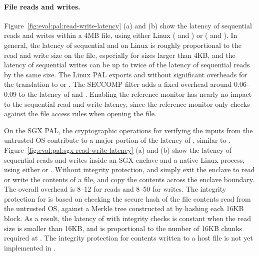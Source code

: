 \paragraph{File reads and writes.}
Figure~\ref{fig:eval:pal:read-write-latency} (a) and (b) show the latency of sequential reads and writes within a 4MB file, using either Linux \linuxapis{} ( and )
or \hostapis{} ( and ).
In general, the latency of sequential  and 
\linuxapis{} on Linux
is roughly proportional to the read and write size on the file,
especially for sizes larger than 4KB, and the latency of sequential writes can be up to twice of the latency of sequential reads by the same size. 
The Linux PAL exports  and 
without significant overheads
for the translation to  or  \linuxapis{}.
The SECCOMP filter adds a fixed overhead around 0.06--0.09 \msec{} to the latency of  and .
Enabling the reference monitor has nearly no impact to the sequential read and write latency,
since the reference monitor only checks against the file access rules
when opening the file.
 

On the SGX PAL, the cryptographic operations for verifying the inputs from the untrusted OS contribute
to a major portion of the latency of , similar to  . 
Figure~\ref{fig:eval:pal:sgx-read-write-latency} (a) and (b) show the latency of sequential reads and writes
inside an SGX enclave and a native Linux process,
using either \hostapis{} or \linuxapis{}.
Without integrity protection,
 and  simply exit the enclave
to read or write the contents of a file,
and copy the contents across the enclave boundary.
The overall overhead is 8--12 \usec{} for reads and 8--50 \usec{} for writes.
The integrity protection
for  is based on
checking the secure hash of the file contents read from the untrusted OS,
against a Merkle tree constructed at 
by hashing each 16KB block.
As a result, the latency of  with integrity checks is constant when the read size is smaller than 16KB, and is proportional to the number of 16KB chunks required at .
The integrity protection for contents written to a host file is not yet implemented in \graphenesgx{}.





